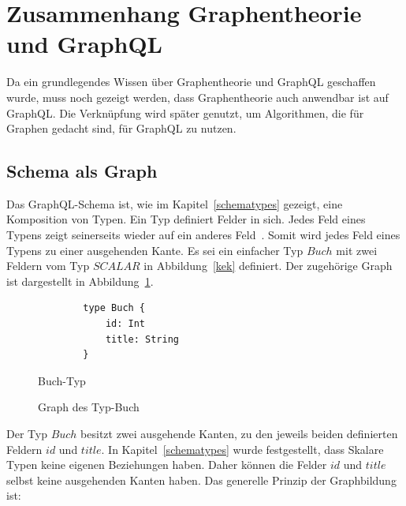 \newpage
\section{Zusammenhang Graphentheorie und GraphQL}
\label{graphtheorieQL}

Da ein grundlegendes Wissen über Graphentheorie und GraphQL geschaffen wurde, muss noch gezeigt werden, dass Graphentheorie auch anwendbar ist auf GraphQL.
Die Verknüpfung wird später genutzt, um Algorithmen, die für Graphen gedacht sind, für GraphQL zu nutzen.

\subsection{Schema als Graph}

Das GraphQL-Schema ist, wie im Kapitel~\ref{schematypes} gezeigt, eine Komposition von Typen.
Ein Typ definiert Felder in sich.
Jedes Feld eines Typens zeigt seinerseits wieder auf ein anderes Feld~\cite[vgl. Modelling with GraphQL]{graphqlgraphtheory}.
Somit wird jedes Feld eines Typens zu einer ausgehenden Kante.
Es sei ein einfacher Typ $Buch$ mit zwei Feldern vom Typ $SCALAR$ in Abbildung~\ref{kek} definiert.
Der zugehörige Graph ist dargestellt in Abbildung~\ref{kekl}.

\begin{figure}[ht]
    \centering
    \begin{minipage}[h]{0.45\textwidth}
        \begin{verbatim}
        type Buch {
            id: Int
            title: String
        }
        \end{verbatim}
        \caption{Buch-Typ}
        \label{kek}
    \end{minipage}
    \hfill
    \begin{minipage}[h]{0.45\textwidth}
        \caption{Graph des Typ-Buch}
        \label{kekl}
    \end{minipage}
\end{figure}

Der Typ $Buch$ besitzt zwei ausgehende Kanten, zu den jeweils beiden definierten Feldern $id$ und $title$.
In Kapitel~\ref{schematypes} wurde festgestellt, dass Skalare Typen keine eigenen Beziehungen haben.
Daher können die Felder $id$ und $title$ selbst keine ausgehenden Kanten haben.
Das generelle Prinzip der Graphbildung ist:

